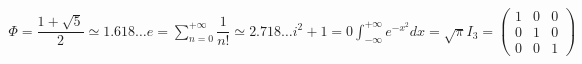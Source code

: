\documentclass[preview]{standalone}
\begin{document}
\begin{align*}
\Phi = \dfrac{1 + \sqrt{5}}{2}\simeq 1.618\dots e = \sum_{n = 0}^{+\infty}\dfrac{1}{n!}\simeq 2.718\dots i^2 + 1 = 0 \int_{-\infty}^{+\infty}e^{-x^2}dx = \sqrt{\pi} I_3 = \begin{pmatrix}1&0&0\\0&1&0\\0&0&1\end{pmatrix}
\end{align*}
\end{document}
